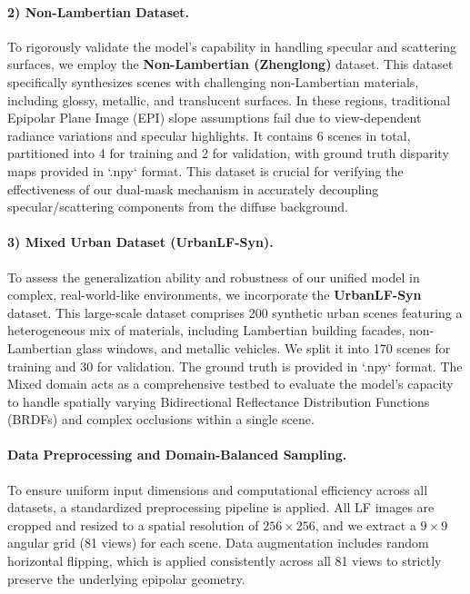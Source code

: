\documentclass[lettersize,journal]{IEEEtran}
\begin{document}
\paragraph{2) Non-Lambertian Dataset.}
To rigorously validate the model's capability in handling specular and scattering surfaces, we employ the \textbf{Non-Lambertian (Zhenglong)} dataset. This dataset specifically synthesizes scenes with challenging non-Lambertian materials, including glossy, metallic, and translucent surfaces. In these regions, traditional Epipolar Plane Image (EPI) slope assumptions fail due to view-dependent radiance variations and specular highlights. It contains 6 scenes in total, partitioned into 4 for training and 2 for validation, with ground truth disparity maps provided in `.npy` format. This dataset is crucial for verifying the effectiveness of our dual-mask mechanism in accurately decoupling specular/scattering components from the diffuse background.

\paragraph{3) Mixed Urban Dataset (UrbanLF-Syn).}
To assess the generalization ability and robustness of our unified model in complex, real-world-like environments, we incorporate the \textbf{UrbanLF-Syn} dataset. This large-scale dataset comprises 200 synthetic urban scenes featuring a heterogeneous mix of materials, including Lambertian building facades, non-Lambertian glass windows, and metallic vehicles. We split it into 170 scenes for training and 30 for validation. The ground truth is provided in `.npy` format. The Mixed domain acts as a comprehensive testbed to evaluate the model's capacity to handle spatially varying Bidirectional Reflectance Distribution Functions (BRDFs) and complex occlusions within a single scene.

\paragraph{Data Preprocessing and Domain-Balanced Sampling.}
To ensure uniform input dimensions and computational efficiency across all datasets, a standardized preprocessing pipeline is applied. All LF images are cropped and resized to a spatial resolution of $256 \times 256$, and we extract a $9 \times 9$ angular grid (81 views) for each scene. Data augmentation includes random horizontal flipping, which is applied consistently across all 81 views to strictly preserve the underlying epipolar geometry.
\end{document}
